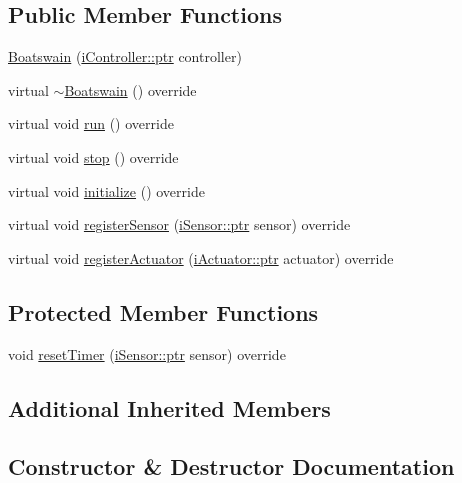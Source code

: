 \subsection*{Public Member Functions}
\begin{DoxyCompactItemize}
\item 
\hyperlink{classo_cpt_1_1_boatswain_a43e10039b53b8bde7ad2e9780db68949}{Boatswain} (\hyperlink{classo_cpt_1_1i_controller_a6d89a95cd6ad68bb74adfaca2f36370f}{i\+Controller\+::ptr} controller)
\item 
virtual \hyperlink{classo_cpt_1_1_boatswain_a0cff16b78dc5ee0e6b5d2169d693036f}{$\sim$\+Boatswain} () override
\item 
virtual void \hyperlink{classo_cpt_1_1_boatswain_a7665a4439b8e71ece31ff5e9755caf09}{run} () override
\item 
virtual void \hyperlink{classo_cpt_1_1_boatswain_ad538cca1d6429dacf09b22c53291074f}{stop} () override
\item 
virtual void \hyperlink{classo_cpt_1_1_boatswain_aa1c27c710e2156402c3851ac189ea162}{initialize} () override
\item 
virtual void \hyperlink{classo_cpt_1_1_boatswain_ab36071db5e3f8a0db0053b5553e508f0}{register\+Sensor} (\hyperlink{classo_cpt_1_1i_sensor_a03533d2c5dc66e332d70dbb3b5e3006a}{i\+Sensor\+::ptr} sensor) override
\item 
virtual void \hyperlink{classo_cpt_1_1_boatswain_ae3f318352a331d64840ff87ad1ce3e8e}{register\+Actuator} (\hyperlink{classo_cpt_1_1i_actuator_a35847799558e92bb84fb6c71de772cac}{i\+Actuator\+::ptr} actuator) override
\end{DoxyCompactItemize}
\subsection*{Protected Member Functions}
\begin{DoxyCompactItemize}
\item 
void \hyperlink{classo_cpt_1_1_boatswain_aca864b4219485c6d83ad0e92c7ea16fd}{reset\+Timer} (\hyperlink{classo_cpt_1_1i_sensor_a03533d2c5dc66e332d70dbb3b5e3006a}{i\+Sensor\+::ptr} sensor) override
\end{DoxyCompactItemize}
\subsection*{Additional Inherited Members}


\subsection{Constructor \& Destructor Documentation}

